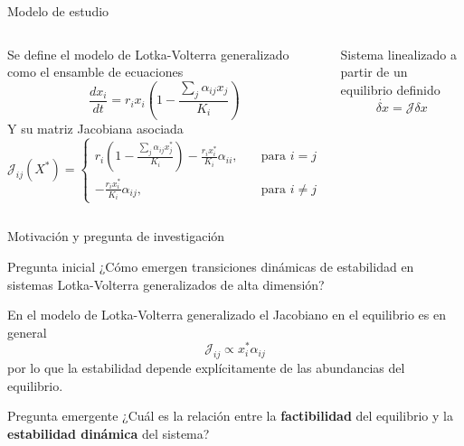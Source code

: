 \documentclass[10pt,aspectratio=169]{beamer}
\theoremstyle{plain}
\theoremstyle{definition}
\begin{document}
\begin{frame}{Modelo de estudio}
	\begin{columns}
		Se define el modelo de Lotka-Volterra generalizado como el ensamble de ecuaciones
		$$\frac{dx_i}{dt}=r_ix_i\left (1-\frac{\sum_j\alpha_{ij}x_j}{K_i}\right )$$
		Y su matriz Jacobiana asociada
		$$\mathcal{J}_{ij}(X^*)=\begin{cases} r_i\left (1-\frac{\sum_j\alpha_{ij}x_j^*}{K_i}\right )-\frac{r_ix_i^*}{K_i}\alpha_{ii},\quad&\text{para }i=j\\ -\frac{r_ix_i^*}{K_i}\alpha_{ij},\quad&\text{para }i\neq j 
		\end{cases}
		$$
		
		
		Sistema linealizado a partir de un equilibrio definido
		$$\dot{\delta x}=\mathcal{J}\delta x$$
		
	\end{columns}
\end{frame}

\begin{frame}{Motivación y pregunta de investigación}
	
	\begin{block}{Pregunta inicial}
		¿Cómo emergen transiciones dinámicas de estabilidad en sistemas Lotka-Volterra generalizados de alta dimensión?
	\end{block}	
	En el modelo de Lotka-Volterra generalizado el Jacobiano en el equilibrio es en general
	$$\mathcal{J}_{ij}\propto x_i^*\alpha_{ij}$$
	por lo que la estabilidad depende explícitamente de las abundancias del equilibrio.
	
	\begin{alertblock}{Pregunta emergente}
		¿Cuál es la relación entre la \textbf{factibilidad}	del equilibrio y la \textbf{estabilidad dinámica} del sistema?
	\end{alertblock}
\end{frame}
\end{document}
